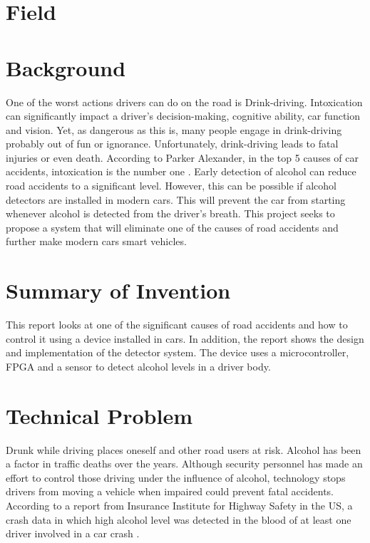 \documentclass[12pt]{article}
\begin{document}
\newpage
\tableofcontents
\newpage
\section{Field}

\section{Background}
One of the worst actions drivers can do on the road is Drink-driving. Intoxication can significantly impact a driver's decision-making, cognitive ability, car function and vision. 
Yet, as dangerous as this is, many people engage in drink-driving probably out of fun or ignorance. Unfortunately, drink-driving leads to fatal injuries or even death.
According to Parker Alexander, in the top 5 causes of car accidents, intoxication is the number one \cite{a3}. Early detection of alcohol can reduce road accidents to a significant level. However, this can be possible if alcohol detectors are installed in modern cars. This will prevent the car from starting whenever alcohol is detected from the driver's breath.  This project seeks to propose a system that will eliminate one of the causes of road accidents and further make modern cars smart vehicles.
\section{Summary of Invention}
This report looks at one of the significant causes of road accidents and how to control it using a device installed in cars. In addition, the report shows the design and implementation of the detector system. The device uses a microcontroller, FPGA and a sensor to detect alcohol levels in a driver body.
%
%


\section{Technical Problem}
Drunk while driving places oneself and other road users at risk. Alcohol has been a factor in traffic deaths over the years. Although security personnel has made an effort to control those driving
under the influence of alcohol, technology stops drivers from moving a vehicle when impaired could prevent fatal accidents. According to a report from Insurance Institute for Highway 
Safety in the US, a crash data in which high alcohol level was detected in the blood of at least one driver involved in a car crash \cite{a4}.
\end{document}
